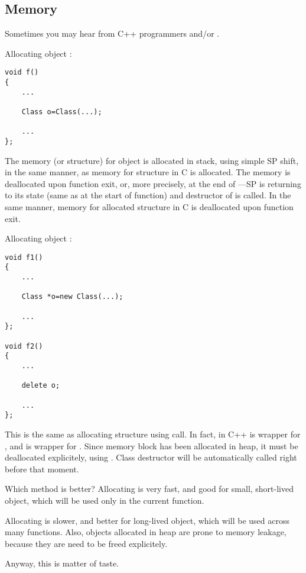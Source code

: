 \subsection{Memory}

Sometimes you may hear from C++ programmers  and/or .

Allocating object :

\begin{lstlisting}
void f()
{
	...

	Class o=Class(...);

	...
};
\end{lstlisting}

The memory (or structure) for object is allocated in stack, using simple \ac{SP} shift, in the same manner, as memory for structure in C is allocated.
The memory is deallocated upon function exit, or, more precisely, at the end of ---\ac{SP} is returning to its state (same as at the start of function) and destructor of  is called.
In the same manner, memory for allocated structure in C is deallocated upon function exit.

Allocating object :

\begin{lstlisting}
void f1()
{
	...

	Class *o=new Class(...);

	...
};

void f2()
{
	...

	delete o;

	...
};
\end{lstlisting}

This is the same as allocating structure using  call.
In fact,  in C++ is wrapper for , and  is wrapper for .
Since memory block has been allocated in \gls{heap}, it must be deallocated explicitely, using .
Class destructor will be automatically called right before that moment.

Which method is better?
Allocating  is very fast, and good for small, short-lived object, which will be used only in the current function.

Allocating  is slower, and better for long-lived object, which will be used across many functions.
Also, objects allocated in \gls{heap} are prone to memory leakage, because they are need to be freed explicitely.

Anyway, this is matter of taste.

